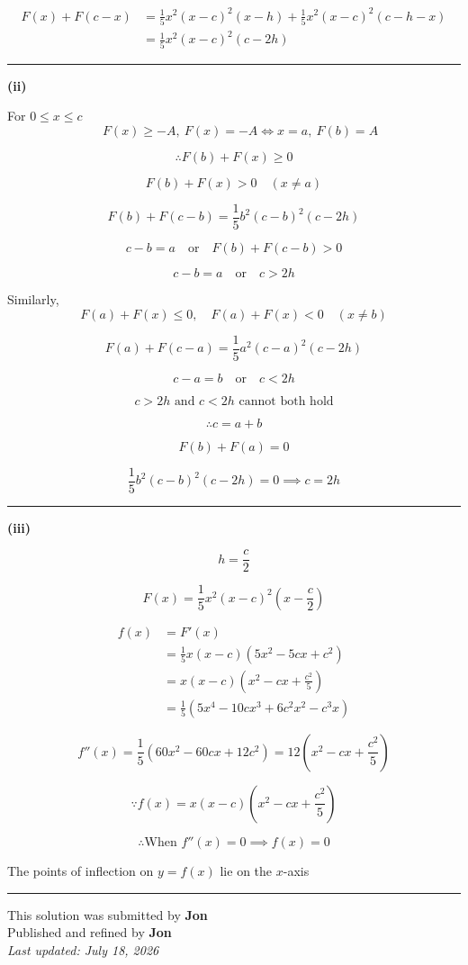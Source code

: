 \documentclass[12pt]{article}
\begin{document}
\begin{align*}
F(x)+F(c-x)
&=\frac15x^2(x-c)^2(x-h)
+\frac15x^2(x-c)^2(c-h-x)\\
&=\frac15x^2(x-c)^2(c-2h)
\end{align*}

\bigskip\hrule\bigskip

\textbf{(ii)}

For $0\leq x\leq c$
$$\quad F(x)\geq -A, \ F(x)=-A\iff x=a,\ F(b)=A$$

$$\therefore F(b)+F(x)\geq0$$

$$F(b)+F(x)>0\quad (x\neq a)$$

$$F(b)+F(c-b)=\frac15b^2(c-b)^2(c-2h)$$

$$c-b=a\quad\text{or}\quad F(b)+F(c-b)>0$$

$$c-b=a\quad\text{or}\quad c>2h$$



Similarly,
$$F(a)+F(x)\leq0,\quad F(a)+F(x)<0\quad (x\neq b)$$

$$F(a)+F(c-a)=\frac15a^2(c-a)^2(c-2h)$$

$$c-a=b\quad \text{or}\quad c<2h$$

$$c>2h\text{ and }c<2h\text{ cannot both hold}$$

$$\therefore c=a+b$$

$$F(b)+F(a)=0$$

$$\frac15b^2(c-b)^2(c-2h)=0\implies c=2h$$

\bigskip\hrule\bigskip

\textbf{(iii)}

$$h=\frac c2$$

$$F(x)=\frac15x^2(x-c)^2\left(x-\frac c2\right)$$

\begin{align*}
f(x)
&=F'(x)\\
&=\frac15x(x-c)(5x^2-5cx+c^2)\\
&=x(x-c)\left(x^2-cx+\frac{c^2}{5}\right)\\
&=\frac15(5x^4-10cx^3+6c^2x^2-c^3x)
\end{align*}

$$f''(x)=\frac15(60x^2-60cx+12c^2)=12\left(x^2-cx+\frac{c^2}{5}\right)$$

$$\because f(x)=x(x-c)\left(x^2-cx+\frac{c^2}{5}\right)$$

$$\therefore \text{When }f''(x)=0\implies f(x)=0$$

The points of inflection on $y=f(x)$ lie on the $x$-axis


\bigskip
\hrule
\begin{center}
    This solution was submitted by \textbf{Jon}\\[4pt]
    Published and refined by \textbf{Jon}\\[8pt]
    \textit{Last updated: July 18, 2026}
\end{center}
\end{document}
